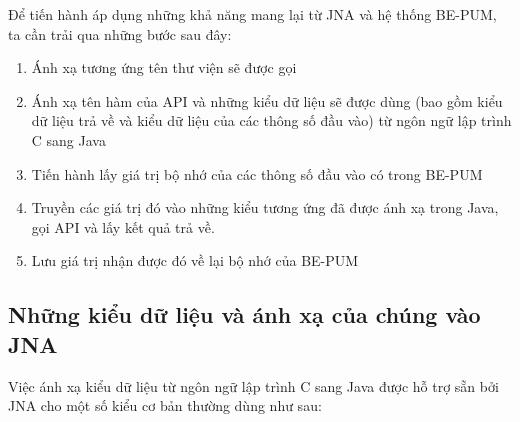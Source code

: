 Để  tiến hành áp dụng những khả năng mang lại từ JNA và hệ thống BE-PUM, ta cần trải qua những bước sau đây:
\begin{enumerate}
	\item Ánh xạ tương ứng tên thư viện sẽ được gọi
	\item Ánh xạ tên hàm của API và những kiểu dữ liệu sẽ được dùng (bao gồm kiểu dữ liệu trả về và kiểu dữ liệu của các thông số đầu vào) từ ngôn ngữ lập trình C sang Java
	\item Tiến hành lấy giá trị bộ nhớ của các thông số đầu vào có trong BE-PUM
	\item Truyền các giá trị đó vào những kiểu tương ứng đã được ánh xạ trong Java, gọi API và lấy kết quả trả về.
	\item Lưu giá trị nhận được đó về lại bộ nhớ của BE-PUM
\end{enumerate}


	\subsection{Những kiểu dữ liệu và ánh xạ của chúng vào JNA}

Việc ánh xạ kiểu dữ liệu từ ngôn ngữ lập trình C sang Java được hỗ trợ sẵn bởi JNA cho một số kiểu cơ bản thường dùng như sau:\\

